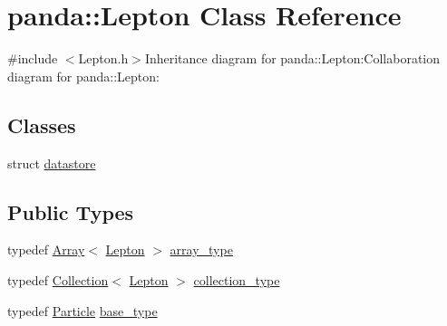 \hypertarget{classpanda_1_1Lepton}{
\section{panda::Lepton Class Reference}
\label{classpanda_1_1Lepton}
}


{\ttfamily \#include $<$Lepton.h$>$}Inheritance diagram for panda::Lepton:Collaboration diagram for panda::Lepton:\subsection*{Classes}
\begin{DoxyCompactItemize}
\item 
struct \hyperlink{structpanda_1_1Lepton_1_1datastore}{datastore}
\end{DoxyCompactItemize}
\subsection*{Public Types}
\begin{DoxyCompactItemize}
\item 
typedef \hyperlink{classpanda_1_1Array}{Array}$<$ \hyperlink{classpanda_1_1Lepton}{Lepton} $>$ \hyperlink{classpanda_1_1Lepton_ad9bce760734162cd7166b034515fe1fe}{array\_\-type}
\item 
typedef \hyperlink{classpanda_1_1Collection}{Collection}$<$ \hyperlink{classpanda_1_1Lepton}{Lepton} $>$ \hyperlink{classpanda_1_1Lepton_acba098c3047ecbfa9c1ad6c88a3ba95f}{collection\_\-type}
\item 
typedef \hyperlink{classpanda_1_1Particle}{Particle} \hyperlink{classpanda_1_1Lepton_ab8f2fc84ff093d5200d1905677d15578}{base\_\-type}
\end{DoxyCompactItemize}
